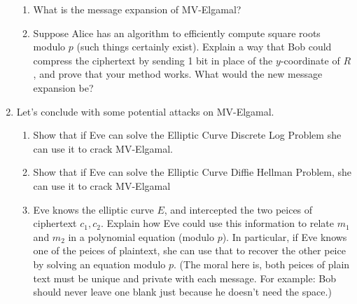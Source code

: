 \documentclass[11pt]{article}
\begin{document}
\begin{enumerate}
{\begin{enumerate}
{    }
    \item{
    What is the message expansion of MV-Elgamal?
    }
    \item{
    Suppose Alice has an algorithm to efficiently compute square roots modulo $p$ (such things certainly exist).  Explain a way that Bob could compress the ciphertext by sending 1 bit in place of the $y$-coordinate of $R$, and prove that your method works.  What would the new message expansion be?
    }
  \end{enumerate}
  }
  \item{
  Let's conclude with some potential attacks on MV-Elgamal.
  \begin{enumerate}
    \item{
    Show that if Eve can solve the Elliptic Curve Discrete Log Problem she can use it to crack MV-Elgamal.
    }
    \item{
    Show that if Eve can solve the Elliptic Curve Diffie Hellman Problem, she can use it to crack MV-Elgamal}
    \item{
    Eve knows the elliptic curve $E$, and intercepted the two peices of ciphertext $c_1,c_2$.  Explain how Eve could use this information to relate $m_1$ and $m_2$ in a polynomial equation (modulo $p$).  In particular, if Eve knows one of the peices of plaintext, she can use that to recover the other peice by solving an equation modulo $p$.  (The moral here is, both peices of plain text must be unique and private with each message.  For example: Bob should never leave one blank just because he doesn't need the space.)
    }
  \end{enumerate}
  }
\end{enumerate}
\end{document}
